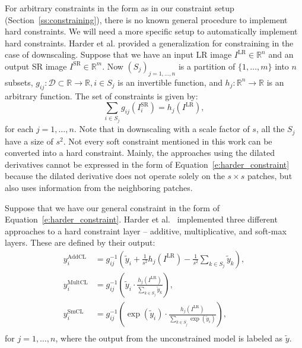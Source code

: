 For arbitrary constraints in the form as in our constraint setup (Section~\ref{ss:constraining}), there is no known general procedure to implement hard constraints.
We will need a more specific setup to automatically implement hard constraints.
\newpage
Harder et al. \cite{Harder2023} provided a generalization for constraining in the case of downscaling.
Suppose that we have an input LR image $I^{\text{LR}} \in \mathbb{R}^n$ and an output SR image $I^{\text{SR}} \in \mathbb{R}^m$.
Now $(S_j)_{j = 1, \dots, n}$ is a partition of $\{1, \dots, m\}$ into $n$ subsets, $g_{ij} : \mathcal{D} \subset \mathbb{R} \to \mathbb{R}, i \in S_j$ is an invertible function, and $h_j:\mathbb{R}^n \to \mathbb{R}$ is an arbitrary function.
The set of constraints is given by:
\begin{equation}
    \sum_{i\in S_j}g_{ij}\left(I^\text{SR}_i\right) = h_j\left(I^{\text{LR}}\right),
    \label{e:harder_constraint}
\end{equation}
for each $j = 1, \dots, n$.
Note that in downscaling with a scale factor of $s$, all the $S_j$ have a size of $s^2$.
Not every soft constraint mentioned in this work can be converted into a hard constraint.
Mainly, the approaches using the dilated derivatives cannot be expressed in the form of Equation~\eqref{e:harder_constraint} because the dilated derivative does not operate solely on the $s\times s$ patches, but also uses information from the neighboring patches.

Suppose that we have our general constraint in the form of Equation~\eqref{e:harder_constraint}.
Harder et al.~\cite{Harder2023} implemented three different approaches to a hard constraint layer -- additive, multiplicative, and soft-max layers.
These are defined by their output:
\begin{equation}
\begin{aligned}
    y_i^\text{AddCL} &= g_{ij}^{-1}\left( \tilde{y}_i + \frac{1}{s^2} h_j\left(I^{\text{LR}}\right) - \frac{1}{s^2} \sum_{k\in S_j}\tilde{y}_k \right), \\
    y_i^\text{MultCL} &= g_{ij}^{-1}\left( \tilde{y}_i \cdot \frac{h_j\left(I^{\text{LR}}\right)}{\sum_{k\in S_j}\tilde{y}_k }\right), \\
    y_i^\text{SmCL} &= g_{ij}^{-1}\left( \exp\left(\tilde{y}_i\right) \cdot \frac{h_j\left(I^{\text{LR}}\right)}{\sum_{k\in S_j}\exp\left(\tilde{y}_i\right) }\right), \\
\end{aligned}
\label{e:hard_constraint_layers}
\end{equation}
for $j = 1, \dots, n$, where the output from the unconstrained model is labeled as $\tilde{y}$.


